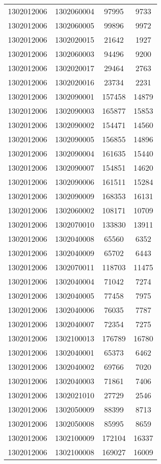 \begin{longtable}[h]{llcc}
		1302012006 & 1302060004 & 97995 & 9733\\
		1302012006 & 1302060005 & 99896 & 9972\\
		1302012006 & 1302020015 & 21642 & 1927\\
		1302012006 & 1302060003 & 94496 & 9200\\
		1302012006 & 1302020017 & 29464 & 2763\\
		1302012006 & 1302020016 & 23734 & 2231\\
		1302012006 & 1302090001 & 157458 & 14879\\
		1302012006 & 1302090003 & 165877 & 15853\\
		1302012006 & 1302090002 & 154471 & 14560\\
		1302012006 & 1302090005 & 156855 & 14896\\
		1302012006 & 1302090004 & 161635 & 15440\\
		1302012006 & 1302090007 & 154851 & 14620\\
		1302012006 & 1302090006 & 161511 & 15284\\
		1302012006 & 1302090009 & 168353 & 16131\\
		1302012006 & 1302060002 & 108171 & 10709\\
		1302012006 & 1302070010 & 133830 & 13911\\
		1302012006 & 1302040008 & 65560 & 6352\\
		1302012006 & 1302040009 & 65702 & 6443\\
		1302012006 & 1302070011 & 118703 & 11475\\
		1302012006 & 1302040004 & 71042 & 7274\\
		1302012006 & 1302040005 & 77458 & 7975\\
		1302012006 & 1302040006 & 76035 & 7787\\
		1302012006 & 1302040007 & 72354 & 7275\\
		1302012006 & 1302100013 & 176789 & 16780\\
		1302012006 & 1302040001 & 65373 & 6462\\
		1302012006 & 1302040002 & 69766 & 7020\\
		1302012006 & 1302040003 & 71861 & 7406\\
		1302012006 & 1302021010 & 27729 & 2546\\
		1302012006 & 1302050009 & 88399 & 8713\\
		1302012006 & 1302050008 & 85995 & 8659\\
		1302012006 & 1302100009 & 172104 & 16337\\
		1302012006 & 1302100008 & 169027 & 16009\\

\end{longtable}
